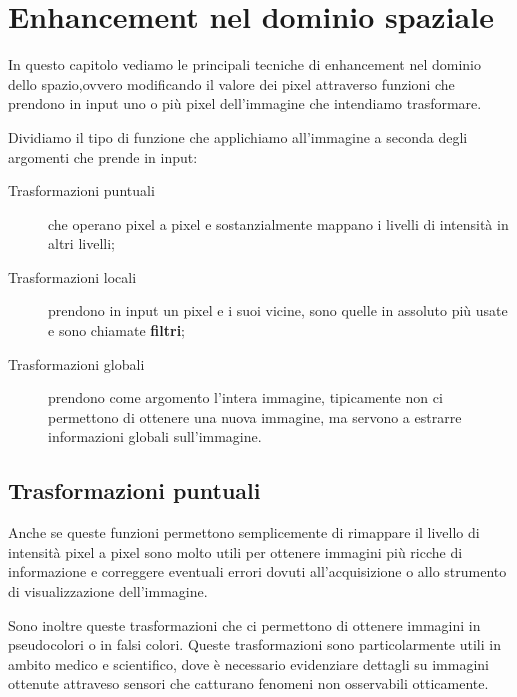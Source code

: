 \chapter{Enhancement nel dominio spaziale}
In questo capitolo vediamo le principali tecniche di enhancement nel dominio dello spazio,ovvero modificando il valore dei pixel attraverso funzioni che prendono in input uno o più pixel dell'immagine che intendiamo trasformare.

Dividiamo il tipo di funzione che applichiamo all'immagine a seconda degli argomenti che prende in input:
\begin{description}
	\item[Trasformazioni puntuali] che operano pixel a pixel e sostanzialmente mappano i livelli di intensità in altri livelli;
	\item[Trasformazioni locali] prendono in input un pixel e i suoi vicine, sono quelle in assoluto più usate e sono chiamate \textbf{filtri};
	\item[Trasformazioni globali] prendono come argomento l'intera immagine, tipicamente non ci permettono di ottenere una nuova immagine, ma servono a estrarre informazioni globali sull'immagine.
\end{description}

\section{Trasformazioni puntuali}
Anche se queste funzioni permettono semplicemente di rimappare il livello di intensità pixel a pixel sono molto utili per ottenere immagini più ricche di informazione e correggere eventuali errori dovuti all'acquisizione o allo strumento di visualizzazione dell'immagine.

Sono inoltre queste trasformazioni che ci permettono di ottenere immagini in pseudocolori o in falsi colori. Queste trasformazioni sono particolarmente utili in ambito medico e scientifico, dove è necessario evidenziare dettagli su immagini ottenute attraveso sensori che catturano fenomeni non osservabili otticamente.
